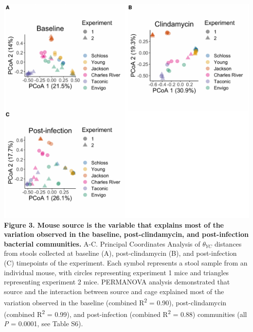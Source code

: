 \documentclass[11pt,]{article}
\begin{document}
\newpage

\includegraphics{figure_3.pdf} \textbf{Figure 3. Mouse source is the
variable that explains most of the variation observed in the baseline,
post-clindamycin, and post-infection bacterial communities.} A-C.
Principal Coordinates Analysis of \(\theta_{YC}\) distances from stools
collected at baseline (A), post-clindamycin (B), and post-infection (C)
timepoints of the experiment. Each symbol represents a stool sample from
an individual mouse, with circles representing experiment 1 mice and
triangles representing experiment 2 mice. PERMANOVA analysis
demonstrated that source and the interaction between source and cage
explained most of the variation observed in the baseline (combined
R\textsuperscript{2} = 0.90), post-clindamycin (combined
R\textsuperscript{2} = 0.99), and post-infection (combined
R\textsuperscript{2} = 0.88) communities (all \emph{P} = 0.0001, see
Table S6).

\newpage
\end{document}
